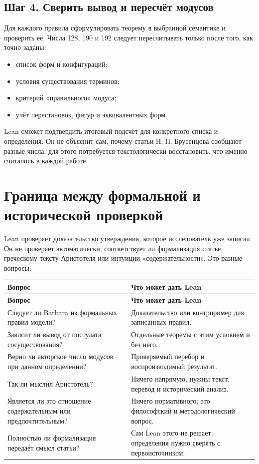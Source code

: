 \documentclass[12pt,a4paper]{article}
\begin{document}
\subsection{Шаг 4. Сверить вывод и пересчёт модусов}

Для каждого правила сформулировать теорему в выбранной семантике и проверить её. Числа 128, 190 и 192 следует пересчитывать только после того, как точно заданы:

\begin{itemize}
\item список форм и конфигураций;
\item условия существования терминов;
\item критерий «правильного» модуса;
\item учёт перестановок, фигур и эквивалентных форм.
\end{itemize}
Lean сможет подтвердить итоговый подсчёт для конкретного списка и определения. Он не объяснит сам, почему статьи Н. П. Брусенцова сообщают разные числа; для этого потребуется текстологически восстановить, что именно считалось в каждой работе.

\section{Граница между формальной и исторической проверкой}

Lean проверяет доказательство утверждения, которое исследователь уже записал. Он не проверяет автоматически, соответствует ли формализация статье, греческому тексту Аристотеля или интуиции «содержательности». Это разные вопросы:

\begin{longtable}{P{0.290\textwidth}P{0.620\textwidth}}
\toprule
\textbf{Вопрос} & \textbf{Что может дать Lean} \\
\midrule
\endfirsthead
\toprule
\textbf{Вопрос} & \textbf{Что может дать Lean} \\
\midrule
\endhead
Следует ли Barbara из формальных правил модели? & Доказательство или контрпример для записанных правил. \\
Зависит ли вывод от постулата сосуществования? & Отдельные теоремы с этим условием и без него. \\
Верно ли авторское число модусов при данном определении? & Проверяемый перебор и воспроизводимый результат. \\
Так ли мыслил Аристотель? & Ничего напрямую; нужны текст, перевод и исторический анализ. \\
Является ли это отношение содержательным или предпочтительным? & Ничего нормативного; это философский и методологический вопрос. \\
Полностью ли формализация передаёт смысл статьи? & Сам Lean этого не решает; определения нужно сверять с первоисточником. \\
\bottomrule
\end{longtable}
\end{document}
